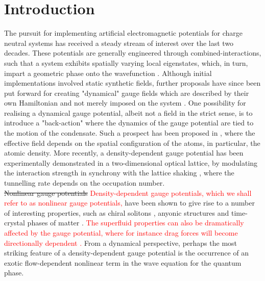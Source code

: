 \documentclass[twocolumn, nofootinbib, nobibnotes, amsmath,amssymb,aps, pra, floatfix]{revtex4-1}
\begin{document}
\section{Introduction}
The pursuit for implementing artificial electromagnetic potentials for charge neutral systems has received a steady stream of interest over the last two decades.
These potentials are generally engineered through combined-interactions, such that a system exhibits spatially varying local eigenstates, which, in turn, impart a geometric phase onto the wavefunction \cite{dalibard2011colloquium,goldman2014light,berry1984quantal,peskin1989aharonov}.
Although initial implementations involved static synthetic fields, further proposals have since been put forward for creating "dynamical" gauge fields which are described by their own Hamiltonian and not merely imposed on the system \cite{kapit2011optical,wiese2013ultracold,banerjee2012atomic,tagliacozzo2013simulation,zohar2013cold,tagliacozzo2013optical}.
One possibility for realising a dynamical gauge potential, albeit not a field in the strict sense, is to introduce a "back-action" where the dynamics of the gauge potential are tied to the motion of the condensate.
Such a prospect has been proposed in \cite{edmonds2013,edmonds2013josephson,keilmann2011statistically,greschner2014density,cardarelli2016engineering,PhysRevLett.115.053002,PhysRevLett.117.205303}, where the effective field depends on the spatial configuration of the atoms, in particular, the atomic density.
More recently, a density-dependent gauge potential has been experimentally demonstrated in a two-dimensional optical lattice, by modulating the interaction strength in synchrony with the lattice shaking \cite{PhysRevLett.121.030402}, where the tunnelling rate depends on the occupation number.\\
\sout{Nonlinear gauge potentials} \textcolor{red}{Density-dependent gauge potentials, which we shall refer to as nonlinear gauge potentials,} have been shown to give rise to a number of interesting properties, such as chiral solitons \cite{edmonds2013,dingwall2018non,dingwall2019stability}, anyonic structures \cite{aglietti1996anyons} and time-crystal phases of matter \cite{ohberg2019quantum}.
\textcolor{red}{The superfluid properties can also be dramatically affected by the gauge potential, where for instance drag forces will become directionally dependent \cite{buggy2019thesis}.}
From a dynamical perspective, perhaps the most striking feature of a density-dependent gauge potential is the occurrence of an exotic flow-dependent nonlinear term in the wave equation for the quantum phase.
\end{document}

